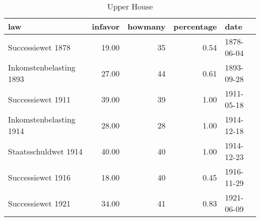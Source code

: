 \begin{table}[ht]
\centering
\begin{tabular}{lrrrl}
  \hline
law & infavor & howmany & percentage & date \\ 
  \hline
Successiewet 1878 & 19.00 &  35 & 0.54 & 1878-06-04 \\ 
  Inkomstenbelasting 1893 & 27.00 &  44 & 0.61 & 1893-09-28 \\ 
  Successiewet 1911 & 39.00 &  39 & 1.00 & 1911-05-18 \\ 
  Inkomstenbelasting 1914 & 28.00 &  28 & 1.00 & 1914-12-18 \\ 
  Staatsschuldwet 1914 & 40.00 &  40 & 1.00 & 1914-12-23 \\ 
  Successiewet 1916 & 18.00 &  40 & 0.45 & 1916-11-29 \\ 
  Successiewet 1921 & 34.00 &  41 & 0.83 & 1921-06-09 \\ 
   \hline
\end{tabular}
\caption{Upper House} 
\end{table}
